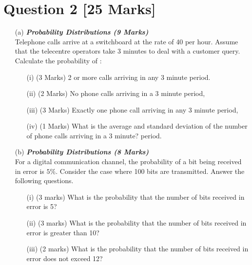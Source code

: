 \documentclass[a4paper,12pt]{article}
\begin{document}
\section*{Question 2 [25 Marks]} 
\begin{itemize}
\item[(a)] \textbf{\textit{Probability Distributions (9 Marks)}}\\
Telephone calls arrive at a switchboard at the rate of 40 per hour.  Assume that the telecentre operators take 3 minutes to deal with a customer query.  Calculate the probability of :
\begin{itemize} 
\item[(i)] (3 Marks)                 2 or more calls arriving in any 3 minute period.
\item[(ii)] (2 Marks)               No phone calls arriving in a 3 minute period,
\item[(iii)] (3 Marks)              Exactly one phone call arriving in any 3 minute period,
\item[(iv)] (1 Marks)             What is the average and standard deviation of the number of phone calls arriving in a 3 minute? period.
\end{itemize}


\bigskip

\item[(b)] \textbf{\textit{Probability Distributions (8 Marks)}}\\
For a digital communication channel, the probability of a bit being received in error is $5\%$. Consider the case where 100 bits are transmitted. Answer the following questions.

\begin{itemize}
\item[(i)] (3 marks)	What is the probability that the number of bits received in error is 5?
\item[(ii)] (3 marks) What is the probability that the number of bits received in error is greater than 10?
\item[(iii)] (2 marks)	What is the probability that the number of bits received in error does not exceed 12?
\end{itemize}


\end{itemize}
\end{document}
